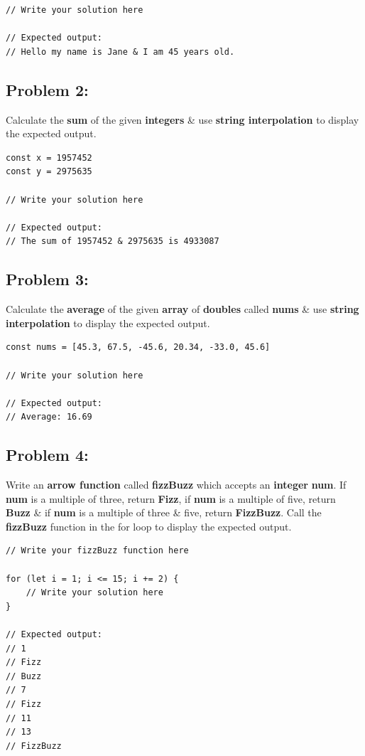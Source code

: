\documentclass{article}
\begin{document}
\begin{verbatim}
// Write your solution here

// Expected output:
// Hello my name is Jane & I am 45 years old.
\end{verbatim}

\subsection*{Problem 2:} 
Calculate the \textbf{sum} of the given \textbf{integers} \& use \textbf{string interpolation} to display the expected output.

\begin{verbatim}
const x = 1957452
const y = 2975635

// Write your solution here

// Expected output:
// The sum of 1957452 & 2975635 is 4933087
\end{verbatim}

\subsection*{Problem 3:} 
Calculate the \textbf{average} of the given \textbf{array} of \textbf{doubles} called \textbf{nums} \& use \textbf{string interpolation} to display the expected output.

\begin{verbatim}
const nums = [45.3, 67.5, -45.6, 20.34, -33.0, 45.6]

// Write your solution here

// Expected output:
// Average: 16.69 
\end{verbatim}

\subsection*{Problem 4:}
Write an \textbf{arrow function} called \textbf{fizzBuzz} which accepts an \textbf{integer} \textbf{num}. If \textbf{num} is a multiple of three, return \textbf{Fizz}, if \textbf{num} is a multiple of five, return \textbf{Buzz} \& if \textbf{num} is a multiple of three \& five, return \textbf{FizzBuzz}. Call the \textbf{fizzBuzz} function in the for loop to display the expected output.

\begin{verbatim}
// Write your fizzBuzz function here

for (let i = 1; i <= 15; i += 2) {
    // Write your solution here
}

// Expected output:
// 1
// Fizz 
// Buzz
// 7
// Fizz
// 11
// 13
// FizzBuzz
\end{verbatim}
\end{document}
